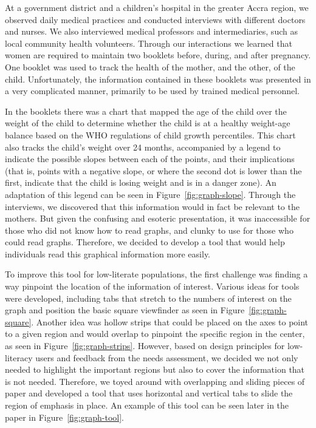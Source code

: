 \documentclass{sig-alternate}
\begin{document}
At a government district and a children's hospital in the greater Accra region, we observed daily medical practices and conducted interviews with different doctors and nurses. We also interviewed medical professors and intermediaries, such as local community health volunteers. Through our interactions we learned that women are required to maintain two booklets before, during, and after pregnancy. One booklet was used to track the health of the mother, and the other, of the child. Unfortunately, the information contained in these booklets was presented in a very complicated manner, primarily to be used by trained medical personnel.

In the booklets there was a chart that mapped the age of the child over the weight of the child to determine whether the child is at a healthy weight-age balance based on the WHO regulations of child growth percentiles. This chart also tracks the child's weight over 24 months, accompanied by a legend to indicate the possible slopes between each of the points, and their implications (that is, points with a negative slope, or where the second dot is lower than the first, indicate that the child is losing weight and is in a danger zone). An adaptation of this legend can be seen in Figure~\ref{fig:graph-slope}. Through the interviews, we discovered that this information would in fact be relevant to the mothers. But given the confusing and esoteric presentation, it was inaccessible for those who did not know how to read graphs, and clunky to use for those who could read graphs. Therefore, we decided to develop a tool that would help individuals read this graphical information more easily.

To improve this tool for low-literate populations, the first challenge was finding a way pinpoint the location of the information of interest. Various ideas for tools were developed, including tabs that stretch to the numbers of interest on the graph and position the basic square viewfinder as seen in Figure~\ref{fig:graph-square}. Another idea was hollow strips that could be placed on the axes to point to a given region and would overlap to pinpoint the specific region in the center, as seen in Figure~\ref{fig:graph-strips}. However, based on design principles for low-literacy users and feedback from the needs assessment, we decided we not only needed to highlight the important regions but also to cover the information that is not needed. Therefore, we toyed around with overlapping and sliding pieces of paper and developed a tool that uses horizontal and vertical tabs to slide the region of emphasis in place. An example of this tool can be seen later in the paper in Figure~\ref{fig:graph-tool}.
\end{document}
